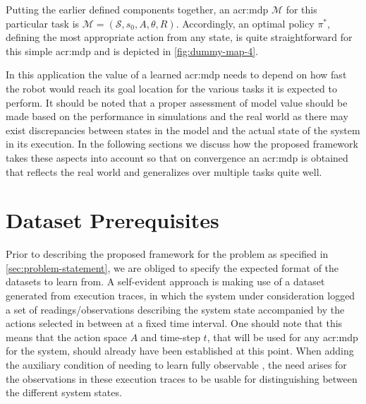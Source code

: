 Putting the earlier defined components together, an \acrshort{acr:mdp} $\mathcal{M}$ for this particular task is $\mathcal{M} = (\mathcal{S}, s_0, A, \theta, R)$.
Accordingly, an optimal policy $\pi^\ast$, defining the most appropriate action from any state, is quite straightforward for this simple \acrshort{acr:mdp} and is depicted in \autoref{fig:dummy-map-4}.

In this application the value of a learned \acrshort{acr:mdp} needs to depend on how fast the robot would reach its goal location for the various tasks it is expected to perform.
It should be noted that a proper assessment of model value should be made based on the performance in simulations and the real world as there may exist discrepancies between states in the model and the actual state of the system in its execution.
In the following sections we discuss how the proposed framework takes these aspects into account so that on convergence an \acrshort{acr:mdp} is obtained that reflects the real world and generalizes over multiple tasks quite well. %


\section{Dataset Prerequisites}
\label{sec:dataset-prerequisites}

Prior to describing the proposed framework for the problem as specified in \autoref{sec:problem-statement}, we are obliged to specify the expected format of the datasets to learn  from.
A self-evident approach is making use of a dataset generated from execution traces, in which the system under consideration logged a set of readings/observations describing the system state accompanied by the actions selected in between at a fixed time interval.
One should note that this means that the action space $A$ and time-step $t$, that will be used for any \acrshort{acr:mdp} for the system, should already have been established at this point.
When adding the auxiliary condition of needing to learn fully observable , the need arises for the observations in these execution traces to be usable for distinguishing between the different system states.

